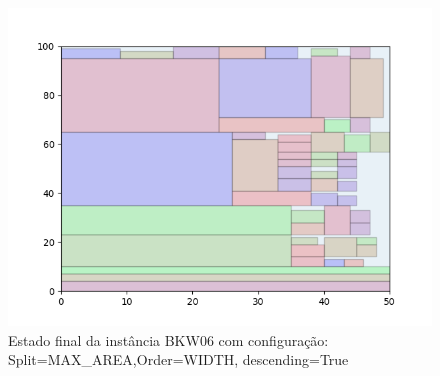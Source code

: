 \begin{figure}[H]
    \centering
    \caption[]{Estado final da instância BKW06 com configuração: Split=MAX_AREA,Order=WIDTH, descending=True}
    \label{fig:bkw06-max_area-width-true}
    \includegraphics[scale=0.5]{output/figures/bkw/bkw06/max_area/width/true/00}
\end{figure}